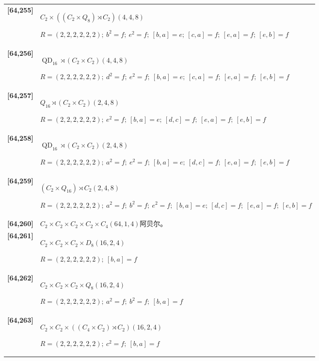 \documentclass[UTF8,fontset=fandol,11pt,a4paper]{ctexart}
\begin{document}
\begin{longtable}{@{}p{17mm}>{\raggedright\arraybackslash}p{141mm}@{}}
\textbf{[64,255]} & $C_{2}\times ((C_{2}\times Q_{8})\rtimes C_{2})$\quad $(4,4,8)$\par\(R=(2,2,2,2,2,2);\allowbreak\ b^{2}=f;\allowbreak\ e^{2}=f;\allowbreak\ [b,a]=e;\allowbreak\ [c,a]=f;\allowbreak\ [e,a]=f;\allowbreak\ [e,b]=f\)\\[3pt]

\textbf{[64,256]} & $\operatorname{QD}_{16}\rtimes (C_{2}\times C_{2})$\quad $(4,4,8)$\par\(R=(2,2,2,2,2,2);\allowbreak\ d^{2}=f;\allowbreak\ e^{2}=f;\allowbreak\ [b,a]=e;\allowbreak\ [c,a]=f;\allowbreak\ [e,a]=f;\allowbreak\ [e,b]=f\)\\[3pt]

\textbf{[64,257]} & $Q_{16}\rtimes (C_{2}\times C_{2})$\quad $(2,4,8)$\par\(R=(2,2,2,2,2,2);\allowbreak\ e^{2}=f;\allowbreak\ [b,a]=e;\allowbreak\ [d,c]=f;\allowbreak\ [e,a]=f;\allowbreak\ [e,b]=f\)\\[3pt]

\textbf{[64,258]} & $\operatorname{QD}_{16}\rtimes (C_{2}\times C_{2})$\quad $(2,4,8)$\par\(R=(2,2,2,2,2,2);\allowbreak\ a^{2}=f;\allowbreak\ e^{2}=f;\allowbreak\ [b,a]=e;\allowbreak\ [d,c]=f;\allowbreak\ [e,a]=f;\allowbreak\ [e,b]=f\)\\[3pt]

\textbf{[64,259]} & $(C_{2}\times Q_{16})\rtimes C_{2}$\quad $(2,4,8)$\par\(R=(2,2,2,2,2,2);\allowbreak\ a^{2}=f;\allowbreak\ b^{2}=f;\allowbreak\ e^{2}=f;\allowbreak\ [b,a]=e;\allowbreak\ [d,c]=f;\allowbreak\ [e,a]=f;\allowbreak\ [e,b]=f\)\\[3pt]

\textbf{[64,260]} & $C_{2}\times C_{2}\times C_{2}\times C_{2}\times C_{4}$\quad $(64,1,4)$\quad 阿贝尔。\\[3pt]

\textbf{[64,261]} & $C_{2}\times C_{2}\times C_{2}\times D_{8}$\quad $(16,2,4)$\par\(R=(2,2,2,2,2,2);\allowbreak\ [b,a]=f\)\\[3pt]

\textbf{[64,262]} & $C_{2}\times C_{2}\times C_{2}\times Q_{8}$\quad $(16,2,4)$\par\(R=(2,2,2,2,2,2);\allowbreak\ a^{2}=f;\allowbreak\ b^{2}=f;\allowbreak\ [b,a]=f\)\\[3pt]

\textbf{[64,263]} & $C_{2}\times C_{2}\times ((C_{4}\times C_{2})\rtimes C_{2})$\quad $(16,2,4)$\par\(R=(2,2,2,2,2,2);\allowbreak\ c^{2}=f;\allowbreak\ [b,a]=f\)\\[3pt]


\end{longtable}
\end{document}
